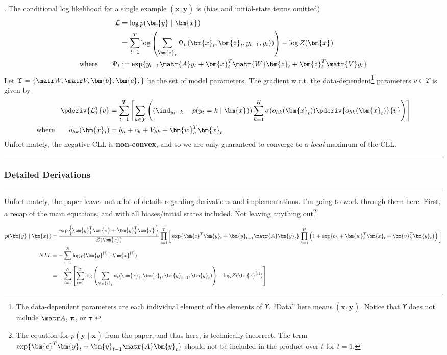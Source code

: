 \documentclass[11pt]{article}
\renewcommand\vec[2][]{\bm{#2}_{#1}}
\newcommand\myspace[1][]{\vspace{#1\bigskipamount}}
\newcommand\p{\Needspace{10\baselineskip} \noindent}
\newcommand\subsub[1]{\Needspace{15\baselineskip}\hrule\subsubsection{#1}\hrule}
\begin{document}
\myspace 
\p {}. The conditional log likelihood for a single example $(\vec x, \vec y)$ is (bias and initial-state terms omitted) 
\begin{align}
	\mathcal{L} &= \log p(\vec y \mid \vec x) \\
	&= \sum_{t = 1}^{T} \log \left( 
		\sum_{\vec[t]{z}} \Psi_t\left( \vec[t]{x}, \vec[t]{z}, y_{t-1}, y_t)  \right)
	\right) - \log Z(\vec x) \\
	\text{where}\qquad \Psi_t &:= \exp\{  y_{t-1} \matr{A} y_t + \vec[t]{x}^T \matr{W} \vec[t]{z} + \vec[t]{z}^T \matr{V} y_t  \}
\end{align}
Let $\Upsilon = \{\matr W, \matr V, \vec b, \vec c, \}$ be the set of model parameters. The gradient w.r.t. the data-dependent\footnote{The data-dependent parameters are each individual element of the elements of $\Upsilon$. ``Data'' here means $(\vec x, \vec y)$. Notice that $\Upsilon$ does not include $\matr A$, $\vec{\pi}$, or $\vec{\tau}$.} parameters $v \in \Upsilon$ is given by
\begin{align}
	\pderiv{\mathcal L}{v} 
	&= \sum_{t=1}^{T} \left[
		\sum_{k \in \mathcal{Y}} \left(
			\left(  \ind_{y_t = k}   -  p(y_t = k \mid \vec x) \right) \sum_{h = 1}^{H} \sigma(o_{hk}(\vec[t]{x})) \pderiv{o_{hk}(\vec[t]{x})}{ v }
		\right)
	\right] 
	\\
	\text{where}\qquad
	o_{hk}(\vec[t]{x}) &= b_h + c_k + V_{hk} + \vec[h]{w}^T \vec[t]{x}
\end{align}
Unfortunately, the negative CLL is \textbf{non-convex}, and so we are only guaranteed to converge to a \textit{local} maximum of the CLL. 


\subsub{Detailed Derivations}

Unfortunately, the paper leaves out a lot of details regarding derivations and implementations. I'm going to work through them here. First, a recap of the main equations, and with all biases/initial states included. Not leaving anything out\footnote{The equation for $p(\vec y \mid \vec x)$ from the paper, and thus here, is technically incorrect. The term $\exp\{ \vec{c}^T \vec[t]{y} + \vec[t-1]{y}\matr{A}\vec[t]{y}   \}$ should not be included in the product over $t$ for $t=1$.}
\begin{small}
\begin{align}
	p(\vec y \mid \vec x) 
		&= \frac{\exp\left\{ \vec[1]{y}^T \vec{\pi} + \vec[T]{y}^T \vec{\tau}  \right\}}{Z(\vec x)} \prod_{t=1}^{T}\bigg[ 
			\exp\{ \vec{c}^T \vec[t]{y} + \vec[t-1]{y}\matr{A}\vec[t]{y}   \}  
			\prod_{h = 1}^{H} \left( 1 + \exp\{ b_h + \vec[h]{w}^T \vec[t]{x} + \vec[h]{v}^T \vec[t]{y}  \} \right)	\bigg] \\
	NLL 
		&= - \sum_{i=1}^{N} \log p(\vec{y}^{(i)} \mid \vec{x}^{(i)}) \\
		&= - \sum_{i=1}^{N} \left[ \sum_{t = 1}^{T} \log \left( \sum_{\vec[t]{z}} \psi_t(\vec[t]{x}, \vec[t]{z}, \vec[t-1]{y}, \vec[t]{y}) \right) 
		   - \log Z(\vec{x}^{(i)}) \right] 
\end{align}
\end{small}
\end{document}
